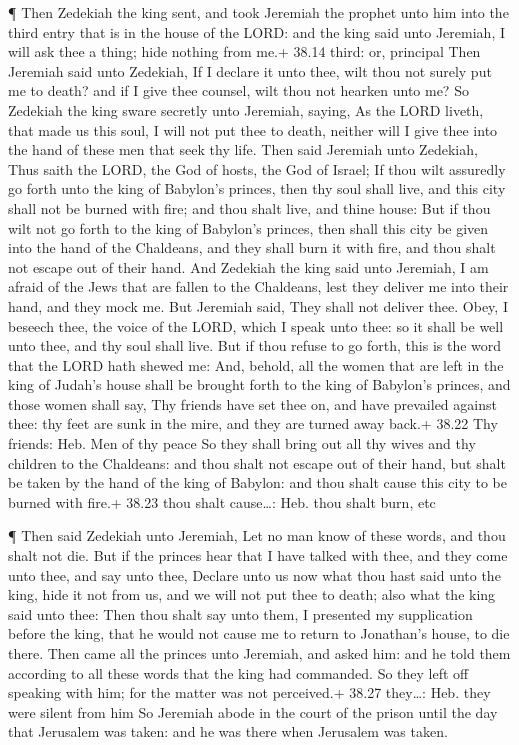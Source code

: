  ¶ Then Zedekiah the king sent, and took Jeremiah the
prophet unto him into the third entry that is in the house of the LORD:
and the king said unto Jeremiah, I will ask thee a thing; hide nothing
from me.+ 38.14 third: or, principal  Then Jeremiah said
unto Zedekiah, If I declare it unto thee, wilt thou not surely put me to
death? and if I give thee counsel, wilt thou not hearken unto me?
 So Zedekiah the king sware secretly unto Jeremiah, saying,
As the LORD liveth, that made us this soul, I will not put thee to
death, neither will I give thee into the hand of these men that seek thy
life.  Then said Jeremiah unto Zedekiah, Thus saith the
LORD, the God of hosts, the God of Israel; If thou wilt assuredly go
forth unto the king of Babylon's princes, then thy soul shall live, and
this city shall not be burned with fire; and thou shalt live, and thine
house:  But if thou wilt not go forth to the king of
Babylon's princes, then shall this city be given into the hand of the
Chaldeans, and they shall burn it with fire, and thou shalt not escape
out of their hand.  And Zedekiah the king said unto
Jeremiah, I am afraid of the Jews that are fallen to the Chaldeans, lest
they deliver me into their hand, and they mock me.  But
Jeremiah said, They shall not deliver thee. Obey, I beseech thee, the
voice of the LORD, which I speak unto thee: so it shall be well unto
thee, and thy soul shall live.  But if thou refuse to go
forth, this is the word that the LORD hath shewed me:  And,
behold, all the women that are left in the king of Judah's house shall
be brought forth to the king of Babylon's princes, and those women shall
say, Thy friends have set thee on, and have prevailed against thee: thy
feet are sunk in the mire, and they are turned away back.+ 38.22 Thy
friends: Heb. Men of thy peace  So they shall bring out all
thy wives and thy children to the Chaldeans: and thou shalt not escape
out of their hand, but shalt be taken by the hand of the king of
Babylon: and thou shalt cause this city to be burned with fire.+ 38.23
thou shalt cause\ldots: Heb. thou shalt burn, etc

 ¶ Then said Zedekiah unto Jeremiah, Let no man know of
these words, and thou shalt not die.  But if the princes
hear that I have talked with thee, and they come unto thee, and say unto
thee, Declare unto us now what thou hast said unto the king, hide it not
from us, and we will not put thee to death; also what the king said unto
thee:  Then thou shalt say unto them, I presented my
supplication before the king, that he would not cause me to return to
Jonathan's house, to die there.  Then came all the princes
unto Jeremiah, and asked him: and he told them according to all these
words that the king had commanded. So they left off speaking with him;
for the matter was not perceived.+ 38.27 they\ldots: Heb. they were
silent from him  So Jeremiah abode in the court of the
prison until the day that Jerusalem was taken: and he was there when
Jerusalem was taken.

